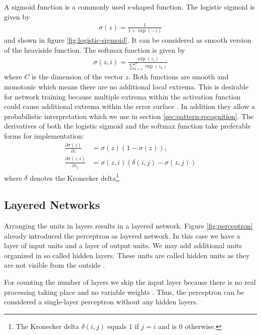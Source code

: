 A sigmoid function is a commonly used s-shaped function. The logistic sigmoid is given by
\begin{align}
\sigma(z) = \frac{1}{1 + \exp(-z)}
\end{align}
and shown in figure \ref{fig:logistic-sigmoid}. It can be considered as smooth version of the heaviside function. The softmax function is given by
\begin{align}
\sigma (z, i) = \frac{\exp(z_i)}{\sum _{k = 1} ^C \exp(z_k)}
\end{align}
where $C$ is the dimension of the vector $z$. Both functions are smooth and monotonic which means there are no additional local extrema. This is desirable for network training because multiple extrema within the activation function could cause additional extrema within the error surface \cite[p.~307-308]{DudaHartStork:2001}. In addition they allow a probabilistic interpretation which we use in section \ref{sec:pattern-recognition}. The derivatives of both the logistic sigmoid and the softmax function take preferable forms for implementation:
\begin{align}
\frac{\partial \sigma (z)}{\partial z} &= \sigma(z) (1 - \sigma(z))\text{,}\\
\frac{\partial \sigma (z, i)}{\partial z_j} &= \sigma(z, i) \left( \delta(i, j) - \sigma(z, j)\right)
\end{align}
where $\delta$ denotes the Kronecker delta\footnote{The Kronecker delta $\delta(i,j)$ equals $1$ if $j = i$ and is $0$ otherwise.}.

\subsection{Layered Networks}
\label{subsec:layered-networks}

Arranging the units in layers results in a layered network. Figure \ref{fig:perceptron} already introduced the perceptron as layered network. In this case we have a layer of input units and a layer of output units. We may add additional units organized in so called hidden layers. These units are called hidden units as they are not visible from the outside \cite[p.~43]{Haykin:2005}.


For counting the number of layers we skip the input layer because there is no real processing taking place and no variable weights \cite[p.~229]{Bishop:2006}. Thus, the perceptron can be considered a single-layer perceptron without any hidden layers.


